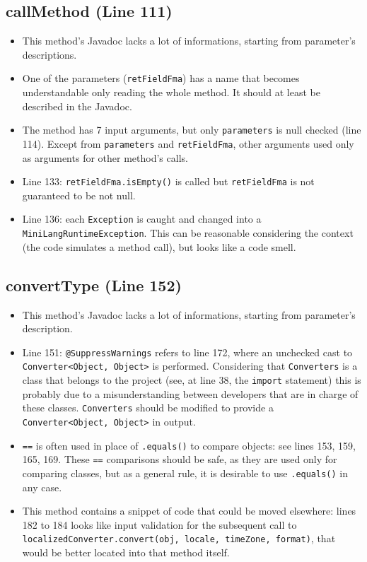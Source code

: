 \documentclass[11pt]{article} %
\begin{document}
\subsection{callMethod (Line 111)}
\begin{itemize}
	\item This method's Javadoc lacks a lot of informations, starting from parameter's descriptions.
	\item One of the parameters (\texttt{retFieldFma}) has a name that becomes understandable only reading the whole method. It should at least be described in the Javadoc.
	\item The method has 7 input arguments, but only \texttt{parameters} is null checked (line 114). Except from \texttt{parameters} and \texttt{retFieldFma}, other arguments used only as arguments for other method's calls. 
	\item Line 133: \texttt{retFieldFma.isEmpty()} is called but \texttt{retFieldFma} is not guaranteed to be not null. 
	\item Line 136: each \texttt{Exception} is caught and changed into a \texttt{MiniLangRuntimeException}. This can be reasonable considering the context (the code simulates a method call), but looks like a code smell.
\end{itemize}

\subsection{convertType (Line 152)}
\begin{itemize}
	\item This method's Javadoc lacks a lot of informations, starting from parameter's description.
	\item Line 151: \texttt{@SuppressWarnings} refers to line 172, where an unchecked cast to \texttt{Converter<Object, Object>} is performed. Considering that \texttt{Converters} is a class that belongs to the project (see, at line 38, the \texttt{import} statement) this is probably due to a misunderstanding between developers that are in charge of these classes. \texttt{Converters} should be modified to provide a \texttt{Converter<Object, Object>} in output.
	\item \texttt{==} is often used in place of \texttt{.equals()} to compare objects: see lines 153, 159, 165, 169. These \texttt{==} comparisons should be safe, as they are used only for comparing classes, but as a general rule, it is desirable to use \texttt{.equals()} in any case.
	\item This method contains a snippet of code that could be moved elsewhere: lines 182 to 184 looks like input validation for the subsequent call to \texttt{localizedConverter.convert(obj, locale, timeZone, format)}, that would be better located into that method itself.
\end{itemize}
\end{document}
